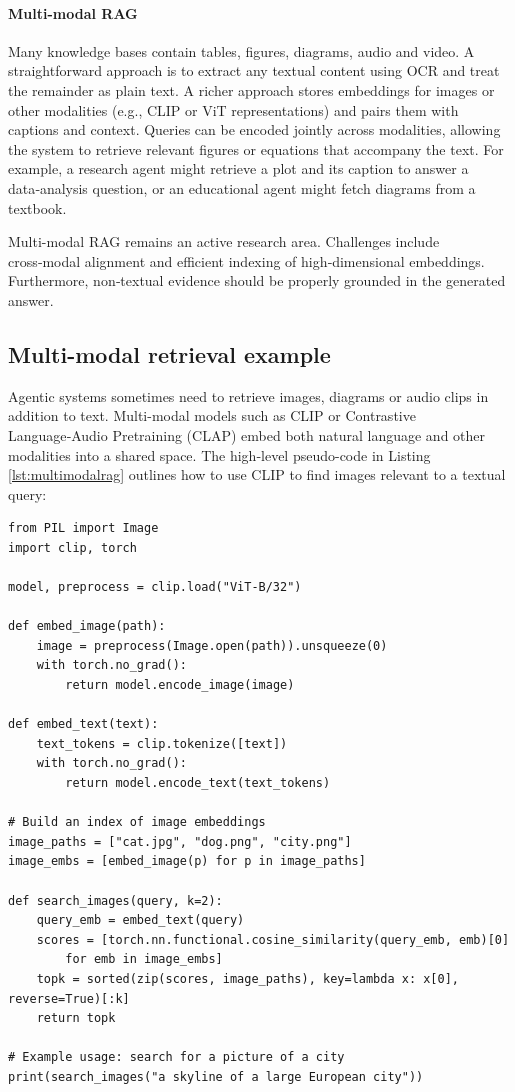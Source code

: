 \paragraph{Multi-modal RAG}  Many knowledge bases contain tables, figures, diagrams, audio and video.  A straightforward approach is to extract any textual content using OCR and treat the remainder as plain text.  A richer approach stores embeddings for images or other modalities (e.g., CLIP or ViT representations) and pairs them with captions and context.  Queries can be encoded jointly across modalities, allowing the system to retrieve relevant figures or equations that accompany the text.  For example, a research agent might retrieve a plot and its caption to answer a data‑analysis question, or an educational agent might fetch diagrams from a textbook.  

Multi-modal RAG remains an active research area. Challenges include cross‑modal alignment and efficient indexing of high‑dimensional embeddings. Furthermore, non‑textual evidence should be properly grounded in the generated answer.


\subsection{Multi-modal retrieval example}
Agentic systems sometimes need to retrieve images, diagrams or audio clips in addition to text.  Multi-modal models such as CLIP or Contrastive Language‑Audio Pretraining (CLAP) embed both natural language and other modalities into a shared space.  The high‑level pseudo-code in Listing \ref{lst:multimodalrag} outlines how to use CLIP to find images relevant to a textual query:


\begin{listing}[!ht]
\begin{verbatim}
from PIL import Image
import clip, torch

model, preprocess = clip.load("ViT-B/32")

def embed_image(path):
    image = preprocess(Image.open(path)).unsqueeze(0)
    with torch.no_grad():
        return model.encode_image(image)

def embed_text(text):
    text_tokens = clip.tokenize([text])
    with torch.no_grad():
        return model.encode_text(text_tokens)

# Build an index of image embeddings
image_paths = ["cat.jpg", "dog.png", "city.png"]
image_embs = [embed_image(p) for p in image_paths]

def search_images(query, k=2):
    query_emb = embed_text(query)
    scores = [torch.nn.functional.cosine_similarity(query_emb, emb)[0] 
        for emb in image_embs]
    topk = sorted(zip(scores, image_paths), key=lambda x: x[0], reverse=True)[:k]
    return topk

# Example usage: search for a picture of a city
print(search_images("a skyline of a large European city"))
\end{verbatim}
\caption{An Example of How to Use CLIP to Find Relevant Images in Python}
\label{lst:multimodalrag}
\end{listing}

